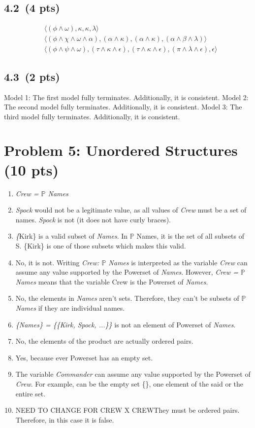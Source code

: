 \documentclass[12pt]{article}
\begin{document}
\subsection*{4.2 \,(4 pts)}
\begin{align*}
    &\langle (\phi \wedge \omega), \kappa, \kappa, \lambda \rangle \\
    &\langle (\phi \wedge \chi \wedge \omega \wedge \alpha), (\alpha \wedge \kappa), (\alpha \wedge \kappa), (\alpha \wedge \beta \wedge \lambda) \rangle \\
    &\langle (\phi \wedge \psi \wedge \omega), (\tau \wedge \kappa \wedge \epsilon), (\tau \wedge \kappa \wedge \epsilon), (\pi \wedge \lambda \wedge \epsilon), \epsilon \rangle
\end{align*}

\subsection*{4.3 \,(2 pts)}
Model 1: The first model fully terminates. Additionally, it is consistent.
Model 2: The second model fully terminates. Additionally, it is consistent.
Model 3: The third model fully terminates. Additionally, it is consistent.
\newpage
\section{Problem 5: Unordered Structures (10 pts)}
\begin{enumerate}
    \item \textit{Crew = $\mathbb{P}$ Names}
    \item \textit{Spock} would not be a legitimate value, as all values of \textit{Crew} must be a set of names. \textit{Spock} is not (it does not have curly braces).
    \item \textit\{Kirk\} is a valid subset of \textit{Names}. In $\mathbb{P}$ Names, it is the set of all subsets of S. \{Kirk\} is one of those subsets which makes this valid.
    \item No, it is not. Writing \textit{Crew: $\mathbb{P}$ Names} is interpreted as the variable \textit{Crew} can assume any value supported by the Powerset of \textit{Names}. However, \textit{Crew = $\mathbb{P}$ Names} means that the variable Crew is the Powerset of \textit{Names}.
    \item No, the elements in \textit{Names} aren't sets. Therefore, they can't be subsets of \textit{$\mathbb{P}$ Names} if they are individual names.
    \item \textit{\{Names\} = \{\{Kirk, Spock, ...\}\}} is not an element of Powerset of \textit{Names}.
    \item No, the elements of the product are actually ordered pairs.
    \item Yes, because ever Powerset has an empty set.
    \item The variable \textit{Commander} can assume any value supported by the Powerset of \textit{Crew}. For example, can be the empty set \{\}, one element of the said or the entire set.
    \item NEED TO CHANGE FOR CREW X CREWThey must be ordered pairs. Therefore, in this case it is false.
\end{enumerate}
\newpage
\end{document}
